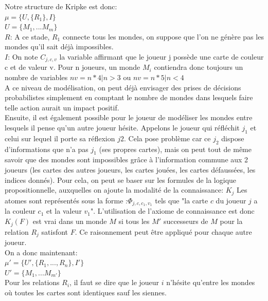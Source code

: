 \documentclass[11pt, letterpaper]{article}
\begin{document}
\noindent
Notre structure de Kripke est donc:\\

$\mu=\{U,\{R_{1}\},I \}  $\\
$   U=\{M_{1},...M_{m} \}   $\\

\noindent
$R$: A ce stade, $R_{1}$ connecte tous les mondes, on suppose que l'on ne génère pas les mondes qu'il sait déjà impossibles.\\

\noindent
$I$: On note    $C_{j,c,v}$ la variable affirmant que le joueur j possède une carte de couleur c et de valeur v. Pour n joueurs, un monde $M_{i}$ contiendra donc toujours un nombre de variables $nv=n*4 | n>3$ ou $nv=n*5 | n<4$\\

\noindent
A ce niveau de modélisation, on peut déjà envisager des prises de décisions probabilistes simplement en comptant le nombre de mondes dans lesquels faire telle action aurait un impact positif.\\

\noindent
Ensuite, il est également possible pour le joueur de modéliser les mondes entre lesquels il pense qu'un autre joueur hésite. Appelons le joueur qui réfléchit $j_1$ et celui sur lequel il porte sa réflexion $j2$. Cela pose problème car ce $j_2$ dispose d'informations que n'a pas $j_1$ (ses propres cartes), mais on peut tout de même savoir que des mondes sont impossibles grâce à l'information commune aux 2 joueurs (les cartes des autres joueurs, les cartes jouées, les cartes défaussées, les indices donnés).
Pour cela, on peut se baser sur les formules de la logique propositionnelle, auxquelles on ajoute la modalité de la connaissance: $K_j$ Les atomes sont représentés sous la forme :$\Phi_{j,c,c_1,v_1}$ tels que "la carte $c$ du joueur $j$ a la couleur $c_1$ et la valeur $v_1$". L'utilisation de l'axiome de connaissance est donc   $K_j(F)$ est vrai dans un monde $M$ si tous les $M'$ successeurs de $M$ pour la relation $R_j$ satisfont $F$. Ce raisonnement peut être appliqué pour chaque autre joueur.\\

\noindent
On a donc maintenant:\\

$\mu'=\{U',\{R_{1},...,R_{n}\},I' \} $\\

$U'=\{M_{1},...M_{m'} \} $\\

\noindent
Pour les relations $R_{i}$, il faut se dire que le joueur $i$ n'hésite qu'entre les mondes où toutes les cartes sont identiques sauf les siennes.\\
\end{document}

